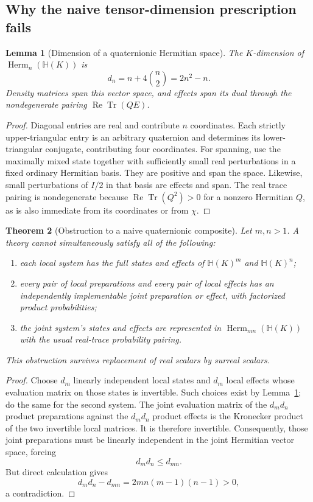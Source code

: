 \documentclass[11pt,oneside]{article}
\numberwithin{equation}{section}
\theoremstyle{plain}
\newtheorem{theorem}{Theorem}[section]
\newtheorem{lemma}[theorem]{Lemma}
\theoremstyle{definition}
\theoremstyle{remark}
\newcommand{\HH}{\mathbb H}
\newcommand{\Tr}{\operatorname{Tr}}
\newcommand{\Rea}{\operatorname{Re}}
\newcommand{\Herm}{\operatorname{Herm}}
\begin{document}
\subsection{Why the naive tensor-dimension prescription fails}
\begin{lemma}[Dimension of a quaternionic Hermitian space]\label{lem:quatdim}
The $K$-dimension of $\Herm_n(\HH(K))$ is
\[
 d_n=n+4\binom n2=2n^2-n.
\]
Density matrices span this vector space, and effects span its dual through the nondegenerate pairing $\Rea\Tr(QE)$.
\end{lemma}
\begin{proof}
Diagonal entries are real and contribute $n$ coordinates. Each strictly upper-triangular entry is an arbitrary quaternion and determines its lower-triangular conjugate, contributing four coordinates. For spanning, use the maximally mixed state together with sufficiently small real perturbations in a fixed ordinary Hermitian basis. They are positive and span the space. Likewise, small perturbations of $I/2$ in that basis are effects and span. The real trace pairing is nondegenerate because $\Rea\Tr(Q^2)>0$ for a nonzero Hermitian $Q$, as is also immediate from its coordinates or from $\chi$.
\end{proof}

\begin{theorem}[Obstruction to a naive quaternionic composite]\label{thm:quatcomposite}
Let $m,n>1$. A theory cannot simultaneously satisfy all of the following:
\begin{enumerate}[label=\textup{(\alph*)},leftmargin=2em,itemsep=2pt]
\item each local system has the full states and effects of $\HH(K)^m$ and $\HH(K)^n$;
\item every pair of local preparations and every pair of local effects has an independently implementable joint preparation or effect, with factorized product probabilities;
\item the joint system's states and effects are represented in $\Herm_{mn}(\HH(K))$ with the usual real-trace probability pairing.
\end{enumerate}
This obstruction survives replacement of real scalars by surreal scalars.
\end{theorem}
\begin{proof}
Choose $d_m$ linearly independent local states and $d_m$ local effects whose evaluation matrix on those states is invertible. Such choices exist by Lemma~\ref{lem:quatdim}; do the same for the second system. The joint evaluation matrix of the $d_md_n$ product preparations against the $d_md_n$ product effects is the Kronecker product of the two invertible local matrices. It is therefore invertible. Consequently, those joint preparations must be linearly independent in the joint Hermitian vector space, forcing
\[
 d_m d_n\le d_{mn}.
\]
But direct calculation gives
\begin{equation}\label{eq:quatdimensiongap}
 d_m d_n-d_{mn}=2mn(m-1)(n-1)>0,
\end{equation}
a contradiction.
\end{proof}
\end{document}
